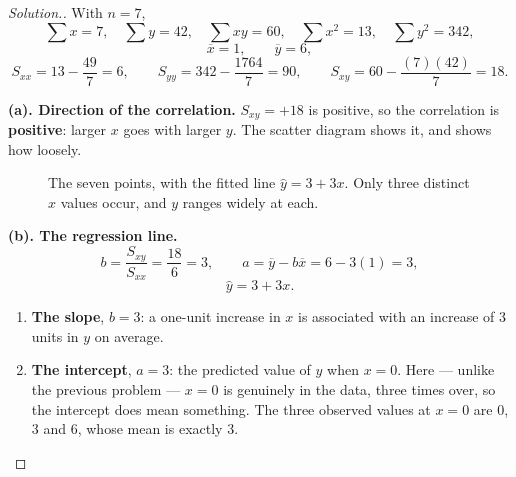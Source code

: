 \documentclass[11pt,a4paper]{article}
\theoremstyle{definition}
\newenvironment{solution}
  {\renewcommand{\qedsymbol}{}\begin{proof}[\textit{Solution}.]}
  {\end{proof}}
\begin{document}
\begin{solution}
With $n=7$,
\[\sum x=7,\quad \sum y=42,\quad \sum xy=60,\quad \sum x^2=13,\quad \sum y^2=342,\]
\[\overline{x}=1,\qquad \overline{y}=6,\]
\[S_{xx}=13-\frac{49}{7}=6,\qquad S_{yy}=342-\frac{1764}{7}=90,\qquad
S_{xy}=60-\frac{(7)(42)}{7}=18.\]

\textbf{(a). Direction of the correlation.} $S_{xy}=+18$ is positive, so the correlation is
\textbf{positive}: larger $x$ goes with larger $y$. The scatter diagram shows it, and shows
how loosely.


\begin{figure}[H]
\centering
{}
\caption{The seven points, with the fitted line $\hat{y}=3+3x$. Only three distinct $x$
values occur, and $y$ ranges widely at each.}
\end{figure}

\textbf{(b). The regression line.}
\[b=\frac{S_{xy}}{S_{xx}}=\frac{18}{6}=3,\qquad a=\overline{y}-b\overline{x}=6-3(1)=3,\]
\[\hat{y}=3+3x.\]
\begin{enumerate}
\item[$\bullet$] \textbf{The slope}, $b=3$: a one-unit increase in $x$ is associated with an
increase of $3$ units in $y$ on average.
\item[$\bullet$] \textbf{The intercept}, $a=3$: the predicted value of $y$ when $x=0$. Here
--- unlike the previous problem --- $x=0$ is genuinely in the data, three times over, so the
intercept does mean something. The three observed values at $x=0$ are $0$, $3$ and $6$,
whose mean is exactly $3$.
\end{enumerate}


\end{solution}
\end{document}
